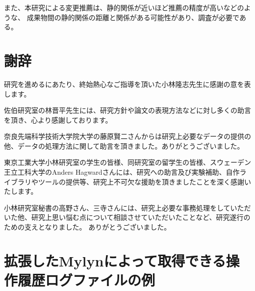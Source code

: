 \documentclass[a4paper]{jsbook}
\begin{document}
また、本研究による変更推薦は、静的関係が近いほど推薦の精度が高いなどのような、
成果物間の静的関係の距離と関係がある可能性があり、調査が必要である。

\chapter*{謝辞}
研究を進めるにあたり、終始熱心なご指導を頂いた小林隆志先生に感謝の意を表します。

佐伯研究室の林晋平先生には、研究方針や論文の表現方法などに対し多くの助言を頂き、心より感謝しております。

奈良先端科学技術大学院大学の藤原賢二さんからは研究上必要なデータの提供の他、データの処理方法に関して助言を頂きました。ありがとうございました。

東京工業大学小林研究室の学生の皆様、同研究室の留学生の皆様、スウェーデン王立工科大学のAnders Hagwardさんには、研究への助言及び実験補助、自作ライブラリやツールの提供等、研究上不可欠な援助を頂きましたことを深く感謝いたします。

小林研究室秘書の高野さん、三寺さんには、研究上必要な事務処理をしていただいた他、研究上思い悩む点について相談させていただいたことなど、研究遂行のための支えとなりました。
ありがとうございました。

\appendix
\chapter{拡張したMylynによって取得できる操作履歴ログファイルの例}\label{mylyn_log_appendix}

\end{document}
